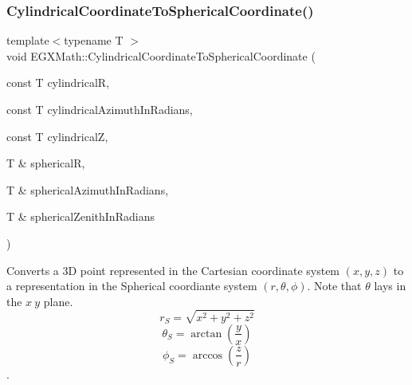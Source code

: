 \subsubsection{\texorpdfstring{Cylindrical\+Coordinate\+To\+Spherical\+Coordinate()}{CylindricalCoordinateToSphericalCoordinate()}}
{\footnotesize\ttfamily template$<$typename T $>$ \\
void E\+G\+X\+Math\+::\+Cylindrical\+Coordinate\+To\+Spherical\+Coordinate (\begin{DoxyParamCaption}\item[{const T}]{cylindricalR,  }\item[{const T}]{cylindrical\+Azimuth\+In\+Radians,  }\item[{const T}]{cylindricalZ,  }\item[{T \&}]{sphericalR,  }\item[{T \&}]{spherical\+Azimuth\+In\+Radians,  }\item[{T \&}]{spherical\+Zenith\+In\+Radians }\end{DoxyParamCaption})}



Converts a 3D point represented in the Cartesian coordinate system $(x,y,z)$ to a representation in the Spherical coordiante system $(r,\theta,\phi)$. Note that $\theta$ lays in the $x\ y$ plane. \[ r_S = \sqrt{x^2+y^2+z^2} \] \[ \theta_S = \arctan(\frac{y}{x}) \] \[ \phi_S = \arccos(\frac{z}{r}) \]. 

